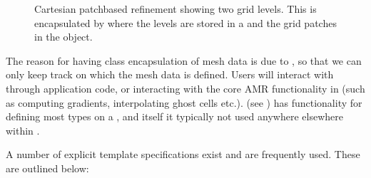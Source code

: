 \documentclass[letterpaper,10pt,english]{sphinxmanual}
\let\sphinxpxdimen\pdfpxdimen\else\newdimen\sphinxpxdimen
\begin{document}
\begin{figure}[htb]
\centering
\capstart

\noindent\sphinxincludegraphics[width=480\sphinxpxdimen]{{PatchBasedAMR}.png}
\caption{Cartesian patch\sphinxhyphen{}based refinement showing two grid levels.
This is encapsulated by  where the levels are stored in a  and the grid patches in the  object.}\label{\detokenize{Source/MeshData:id3}}\label{\detokenize{Source/MeshData:fig-ebamrdata}}\end{figure}

The reason for having class encapsulation of mesh data is due to {\hyperref[\detokenize{Source/Realm:chap-realm}]{}}, so that we can only keep track on which  the mesh data is defined.
Users will interact with  through application code, or interacting with the core AMR functionality in {\hyperref[\detokenize{Source/AmrMesh:chap-amrmesh}]{}} (such as computing gradients, interpolating ghost cells etc.).
 (see {\hyperref[\detokenize{Source/AmrMesh:chap-amrmesh}]{}}) has functionality for defining most  types on a , and  itself it typically not used anywhere elsewhere within .

A number of explicit template specifications exist and are frequently used.
These are outlined below:
\end{document}
